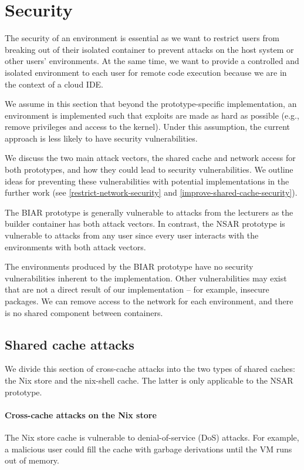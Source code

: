 \section{Security}\label{results-security}
The security of an environment is essential as we want to restrict users from breaking out of their isolated container to prevent attacks on the host system or other users' environments. At the same time, we want to provide a controlled and isolated environment to each user for remote code execution because we are in the context of a cloud IDE. 

We assume in this section that beyond the prototype-specific implementation, an environment is implemented such that exploits are made as hard as possible (e.g., remove privileges and access to the kernel). Under this assumption, the current approach is less likely to have security vulnerabilities. 

We discuss the two main attack vectors, the shared cache and network access for both prototypes, and how they could lead to security vulnerabilities. We outline ideas for preventing these vulnerabilities with potential implementations in the further work (see \ref{restrict-network-security} and \ref{improve-shared-cache-security}).

The BIAR prototype is generally vulnerable to attacks from the lecturers as the builder container has both attack vectors. In contrast, the NSAR prototype is vulnerable to attacks from any user since every user interacts with the environments with both attack vectors.

The environments produced by the BIAR prototype have no security vulnerabilities inherent to the implementation. Other vulnerabilities may exist that are not a direct result of our implementation -- for example, insecure packages. We can remove access to the network for each environment, and there is no shared component between containers. 
\subsection{Shared cache attacks}
We divide this section of cross-cache attacks into the two types of shared caches: the Nix store and the nix-shell cache. The latter is only applicable to the NSAR prototype.
\paragraph{Cross-cache attacks on the Nix store}\label{cross-cache-attacks-on-nix-store}
The Nix store cache is vulnerable to denial-of-service (DoS) attacks. For example, a malicious user could fill the cache with garbage derivations until the VM runs out of memory.

